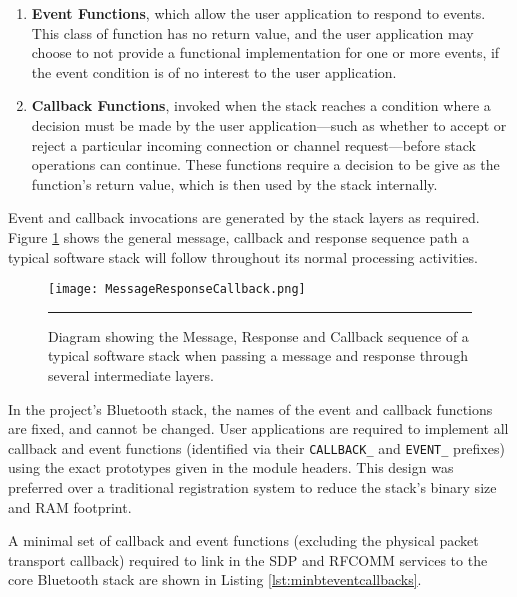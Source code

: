 \begin{enumerate}
	\item \textbf{Event Functions}, which allow the user application to respond to events. This class of function has no return value, and the user application may choose to not provide a functional implementation for one or more events, if the event condition is of no interest to the user application.
	\item \textbf{Callback Functions}, invoked when the stack reaches a condition where a decision must be made by the user application---such as whether to accept or reject a particular incoming connection or channel request---before stack operations can continue. These functions require a decision to be give as the function's return value, which is then used by the stack internally.
\end{enumerate}

Event and callback invocations are generated by the stack layers as required. Figure \ref{fig:messageresponsecallback} shows the general message, callback and response sequence path a typical software stack will follow throughout its normal processing activities.

\begin{figure}[tbph]
	\vspace{1em}
	\centering
		\texttt{[image: MessageResponseCallback.png]}
	\rule{35em}{0.5pt}
	\caption[Diagram of the Message, Response and Callback sequence]{Diagram showing the Message, Response and Callback sequence of a typical software stack when passing a message and response through several intermediate layers.}
	\label{fig:messageresponsecallback}
\end{figure}

In the project's Bluetooth stack, the names of the event and callback functions are fixed, and cannot be changed. User applications are required to implement all callback and event functions (identified via their \lstinline{CALLBACK_} and \lstinline{EVENT_} prefixes) using the exact prototypes given in the module headers. This design was preferred over a traditional registration system to reduce the stack's binary size and RAM footprint.

A minimal set of callback and event functions (excluding the physical packet transport callback) required to link in the SDP and RFCOMM services to the core Bluetooth stack are shown in Listing \ref{lst:minbteventcallbacks}.



